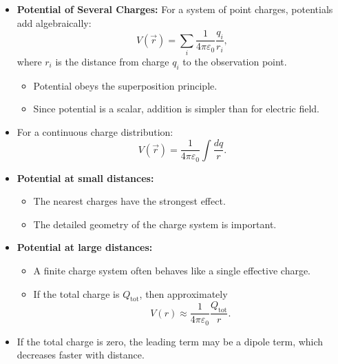 \documentclass[t,aspectratio=169]{beamer}
\begin{document}
\begin{frame}
\begin{itemize}
\begin{columns}
\end{columns}

\pagebreak
\item \textbf{Potential of Several Charges:} For a system of point charges, potentials add algebraically:
$$ V(\vec{r}) = \sum_i \frac{1}{4\pi\varepsilon_0}\frac{q_i}{r_i}, $$
where $r_i$ is the distance from charge $q_i$ to the observation point.

\begin{itemize}
\item Potential obeys the superposition principle.
\item Since potential is a scalar, addition is simpler than for electric field.
\end{itemize}

\item For a continuous charge distribution:
$$ V(\vec{r}) = \frac{1}{4\pi\varepsilon_0}\int \frac{dq}{r}. $$

\pagebreak
\item \textbf{Potential at small distances:}
\begin{itemize}
\item The nearest charges have the strongest effect.
\item The detailed geometry of the charge system is important.
\end{itemize}

\item \textbf{Potential at large distances:}
\begin{itemize}
\item A finite charge system often behaves like a single effective charge.
\item If the total charge is $Q_{\text{tot}}$, then approximately
$$ V(r) \approx \frac{1}{4\pi\varepsilon_0}\frac{Q_{\text{tot}}}{r}. $$
\end{itemize}
\item If the total charge is zero, the leading term may be a dipole term, which decreases faster with distance.


\end{itemize}
\end{frame}
\end{document}
